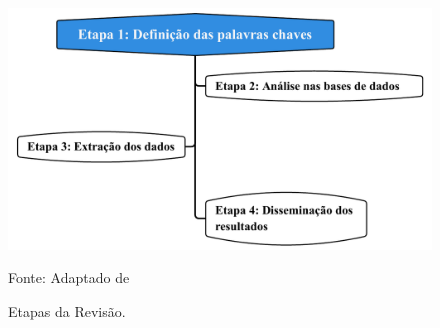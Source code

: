 \begin{figure}[H]
	\centering
	\caption{Etapas da Revisão.}
	\label{fig:rsl}
	\includegraphics[width=0.9\linewidth]{Revisao/Figuras/RSL}
	
	Fonte: Adaptado de 
\end{figure}
